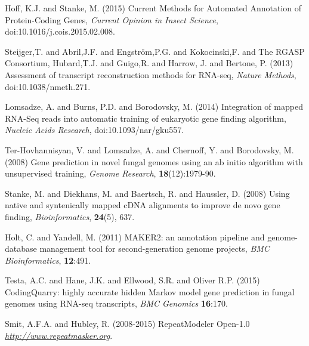 \documentclass[a4paper,10pt]{article}
\begin{document}
%
%
%
%
%
%
%
%
%


\begin{thebibliography}{}
Hoff, K.J. and Stanke, M. (2015) Current Methods for Automated Annotation of Protein-Coding Genes, {\it Current Opinion in Insect Science}, doi:10.1016/j.cois.2015.02.008.

 Steijger,T. and Abril,J.F. and Engstr\"{o}m,P.G. and Kokocinski,F. and The RGASP Consortium, Hubard,T.J. and Guigo,R. and Harrow, J. and Bertone, P. (2013) Assessment of transcript reconstruction methods for
 RNA-seq, {\it Nature Methods}, doi:10.1038/nmeth.271.

 Lomsadze, A. and Burns, P.D. and Borodovsky, M. (2014) Integration of mapped RNA-Seq reads into automatic training of eukaryotic gene finding algorithm, {\it Nucleic Acids Research}, doi:10.1093/nar/gku557.

 Ter-Hovhannisyan, V. and Lomsadze, A. and Chernoff, Y. and Borodovsky, M. (2008) Gene prediction in novel fungal genomes using an ab initio algorithm with unsupervised training, \textit{Genome Research}, \textbf{18}(12):1979-90.

Stanke, M. and Diekhans, M. and Baertsch, R. and Haussler, D. (2008) Using native and syntenically mapped cDNA alignments to improve de novo gene finding, \textit{Bioinformatics}, \textbf{24}(5), 637.

 Holt, C. and Yandell, M. (2011) MAKER2: an annotation pipeline and genome-database management tool for second-generation genome projects, \textit{BMC Bioinformatics}, \textbf{12}:491.

 Testa, A.C. and Hane, J.K. and Ellwood, S.R. and Oliver R.P. (2015) CodingQuarry: highly accurate hidden Markov model gene prediction in fungal genomes using RNA-seq transcripts, \textit{BMC Genomics} \textbf{16}:170.

 Smit, A.F.A. and Hubley, R. (2008-2015) RepeatModeler Open-1.0 \textit{\url{http://www.repeatmasker.org}}.


\end{thebibliography}
\end{document}
